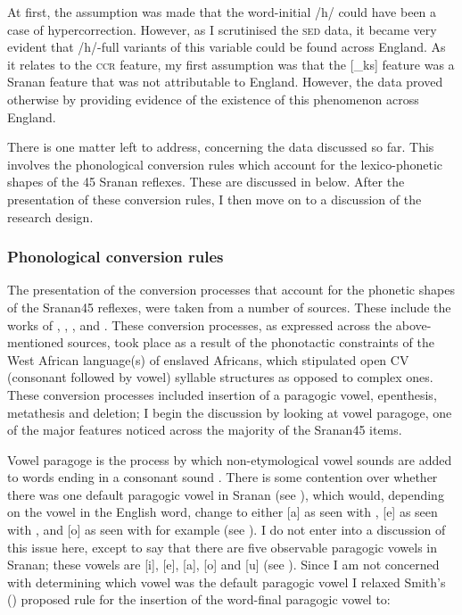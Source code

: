 {{{{{{{{{At first, the assumption was made that the word-initial /h/ could have been a case of hypercorrection. However, as I scrutinised the \textsc{sed} data, it became very evident that /h/-full variants of this variable could be found across England. As it relates to the \textsc{ccr} feature, my first assumption was that the [\_ks] feature was a Sranan feature that was not attributable to England. However, the data proved otherwise by providing evidence of the existence of this phenomenon across England.

There is one matter left to address, concerning the data discussed so far. This involves the phonological conversion rules which account for the lexico-phonetic shapes of the 45 Sranan reflexes. These are discussed in  below. After the presentation of these conversion rules, I then move on to a discussion of the research design.

\subsubsection{Phonological conversion rules}\label{3.3.2.9}
The presentation of the conversion processes that account for the phonetic shapes of the Sranan45 reflexes, were taken from a number of sources. These include the works of \citet{Smith77, Smith87, Smith08}, \citet{DeCamp74}, \citet{Holm88}, and \citet{Plag00}. These conversion processes, as expressed across the above-mentioned sources, took place as a result of the phonotactic constraints of the West African language(s) of enslaved Africans, which stipulated open CV (consonant followed by vowel) syllable structures as opposed to complex ones. These conversion processes included insertion of a paragogic vowel, epenthesis, metathesis and deletion; I begin the discussion by looking at vowel paragoge, one of the major features noticed across the majority of the Sranan45 items.

Vowel paragoge is the process by which non-etymological vowel sounds are added to words ending in a consonant sound \citep{Plag00}. There is some contention over whether there was one default paragogic vowel in Sranan (see \citealt{Smith77}), which would, depending on the vowel in the English word, change to either [a] as seen with \textipa{[masra]}, [e] as seen with \textipa{[memere]}, and [o] as seen with \textipa{[moro]} for example (see \citealt{Plag00}). I do not enter into a discussion of this issue here, except to say that there are five observable paragogic vowels in Sranan; these vowels are [i], [e], [a], [o] and [u] (see \citealt[311]{Plag00}). Since I am not concerned with determining which vowel was the default paragogic vowel I relaxed Smith's (\citeyear{Smith77}) proposed rule for the insertion of the word-final paragogic vowel to:

}}}}}}}}}
